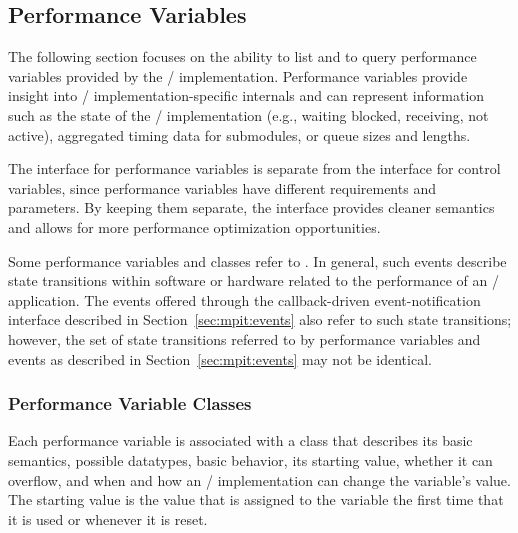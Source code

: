 \subsection{Performance Variables}
\label{sec:mpit:pvar}

The following section focuses on the ability to list and to query
performance variables provided by the \MPI/ implementation.  Performance
variables provide insight into \MPI/ implementation-specific internals and
can represent information such as the state of the \MPI/ implementation
(e.g., waiting blocked, receiving, not active), aggregated timing data for
submodules, or queue sizes and lengths.


\begin{rationale}
The interface for performance variables is separate from the interface for
control variables, since performance variables have different requirements
and parameters.  By keeping them separate, the interface provides cleaner
semantics and allows for more performance optimization opportunities.
\end{rationale}

Some performance variables and classes refer to .
%
%
In general,
such events describe state transitions within software or hardware related
to the performance of an \MPI/ application. The events offered through the
callback-driven event-notification interface described in
Section~\ref{sec:mpit:events} also refer to such state transitions;
however, the set of state transitions referred to by performance variables and
events as described in Section~\ref{sec:mpit:events} may not be identical.

\subsubsection{Performance Variable Classes}
\label{sec:tools:mpit:classes}

Each performance variable is associated with a class that describes its
basic semantics, possible datatypes, basic behavior, its starting value,
whether it can overflow, and when and how an \MPI/ implementation can
change the variable's value.  The starting value is the value that is
assigned to the variable the first time that it is used or whenever it is
reset.

